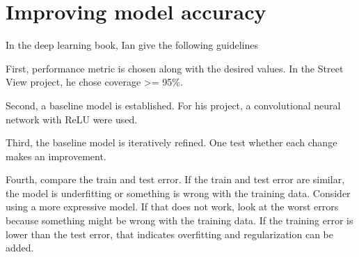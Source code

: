 \documentclass{article}
\begin{document}
\section{Improving model accuracy}
In the deep learning book, Ian give the following guidelines

First, performance metric is chosen along with the desired values. In the Street View project, he chose coverage >= 95\%. 

Second, a baseline model is established. For his project, a convolutional neural network with ReLU were used. 

Third, the baseline model is iteratively refined. One test whether each change makes an improvement. 

Fourth, compare the train and test error. If the train and test error are similar, the model is underfitting or something is wrong with the training data. Consider using a more expressive model. If that does not work, look at the worst errors because something might be wrong with the training data. If the training error is lower than the test error, that indicates overfitting and regularization can be added. 
\end{document}
